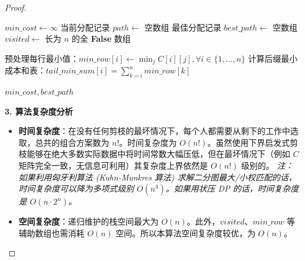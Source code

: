 \documentclass[11pt, a4paper]{article}
\begin{document}
\begin{proof}
\begin{algorithm}[H]
    $min\_cost \gets \infty$\;
    当前分配记录 $path \gets$ 空数组\;
    最佳分配记录 $best\_path \gets$ 空数组\;
    $visited \gets$ 长为 $n$ 的全 \textbf{False} 数组\;
    
    预处理每行最小值：$min\_row[i] \gets \min_{j} C[i][j], \forall i \in \{1, \dots, n\}$\;
    计算后缀最小成本和表：$tail\_min\_sum[i] = \sum_{k=i}^n min\_row[k]$\;
    
    
     \;
    \Return $min\_cost, best\_path$\;
    \end{algorithm}

    \textbf{3. 算法复杂度分析}
    
    \begin{itemize}
        \item \textbf{时间复杂度}：在没有任何剪枝的最坏情况下，每个人都需要从剩下的工作中选取，总共的组合方案数为 $n!$。时间复杂度为 $O(n!)$。虽然使用下界启发式剪枝能够在绝大多数实际数据中将时间常数大幅压低，但在最坏情况下（例如 $C$ 矩阵完全一致，无信息可利用）其复杂度上界依然是 $O(n!)$ 级别的。
        \textit{注：如果利用匈牙利算法 (Kuhn-Munkres 算法) 求解二分图最大/小权匹配的话，时间复杂度可以降为多项式级别 $O(n^3)$。如果用状压 DP 的话，时间复杂度是 $O(n \cdot 2^n)$。}
        \item \textbf{空间复杂度}：递归维护的栈空间最大为 $O(n)$。此外，$visited$、$min\_row$ 等辅助数组也需消耗 $O(n)$ 空间。所以本算法空间复杂度较优，为 $O(n)$。
    \end{itemize}
\end{proof}

\vspace{1em}
\end{document}

